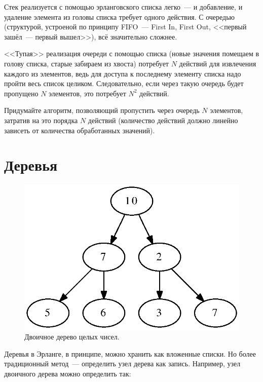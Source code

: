 \documentclass[
  paper=a4,
  fontsize=14pt,
  openany,
  appendixprefix=true
]{scrbook}
\begin{document}
\begin{problem}\label{queue}
\complicated Стек реализуется с помощью эрланговского списка легко~--- и добавление, и удаление элемента из головы списка требует одного действия. С очередью (структурой, устроеной по принципу FIFO~--- First In, First Out, <<первый зашёл~--- первый вышел>>), всё значительно сложнее.

<<Тупая>> реализация очереди с помощью списка (новые значения помещаем в голову списка, старые забираем из хвоста) потребует $N$ действий для извлечения каждого из элементов, ведь для доступа к последнему элементу списка надо пройти весь список целиком. Следовательно, если через такую очередь будет пропущено $N$ элементов, это потребует $N^2$ действий.

Придумайте алгоритм, позволяющий пропустить через очередь $N$ элементов, затратив на это порядка $N$ действий (количество действий должно линейно зависеть от количества обработанных значений).~\cite[6.2.2]{shen}
\end{problem}

\section{Деревья}


\begin{figure}[!t,tree]
\centerline{
  \includegraphics[width=130mm]{tree.ps}
}
\caption{Двоичное дерево целых чисел.}
\label{tree}
\end{figure}

Деревья в Эрланге, в принципе, можно хранить как вложенные списки. Но более традиционный метод~--- определить узел дерева как запись. Например, узел двоичного дерева можно определить так:
\end{document}
